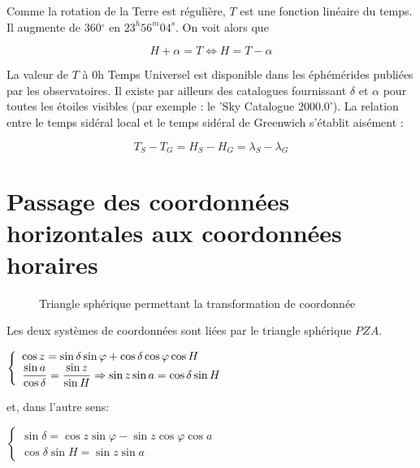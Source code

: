 \documentclass[12pt]{report}
\begin{document}
Comme la rotation de la Terre est régulière, $T$ est une fonction linéaire du temps. Il augmente de 360$^\circ$ en $23^h56^m04^s$. On voit alors que

\begin{equation*}
H+\alpha = T \Leftrightarrow H = T-\alpha
\end{equation*}

La valeur de $T$ à 0h Temps Universel est disponible dans les éphémérides publiées par les observatoires. Il existe par ailleurs des catalogues fournissant $\delta$ et $\alpha$ pour toutes les étoiles visibles (par exemple : le 'Sky Catalogue 2000.0'). La relation entre le temps sidéral local et le temps sidéral de Greenwich s'établit aisément :

\begin{equation*}
T_S - T_G = H_S - H_G = \lambda_S - \lambda_G
\end{equation*}


\section{Passage des coordonnées horizontales aux coordonnées horaires}


\begin{figure}[ht]
\begin{center}
\end{center}
\caption{Triangle sphérique permettant la transformation de coordonnée}
\label{fig:19}
\end{figure}


Les deux systèmes de coordonnées sont liées par le triangle sphérique $PZA$. 

$
\left\{
\begin{array}{lll}
\cos z = \sin \delta \sin \varphi + \cos \delta \cos \varphi \cos H\\
\displaystyle {\sin a \over \cos \delta} = {\sin z \over \sin H} \Rightarrow \sin z \sin a = \cos \delta \sin H
\end{array}
\right.
$

\bigskip

et, dans l'autre sens:

\bigskip


$
\left\{
\begin{array}{lll}
  \sin \delta =  \cos z  \sin \varphi  - \sin z \cos \varphi \cos a\\
\cos \delta \sin H = \sin z \sin a
\end{array}
\right.
$
\bigskip
\end{document}
